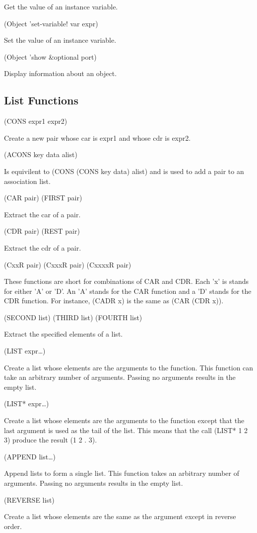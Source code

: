 \documentclass[11pt]{article}
\begin{document}
Get the value of an instance variable.

(Object 'set-variable! var expr)

Set the value of an instance variable.

(Object 'show  \&optional port)

Display information about an object.
\subsection{List Functions}
\label{sec-1-15}

(CONS expr1 expr2)

Create a new pair whose car is expr1 and whose cdr is expr2.

(ACONS key data alist)

Is equivilent to (CONS (CONS key data) alist) and is used to add a pair
to an association list.

(CAR pair)
(FIRST pair)

Extract the car of a pair.

(CDR pair)
(REST pair)

Extract the cdr of a pair.

(CxxR pair)
(CxxxR pair)
(CxxxxR pair)

These functions are short for combinations of CAR and CDR. Each 'x' is stands for either 'A' or 'D'. An 'A' stands for the CAR function and a 'D' stands for the CDR function. For instance, (CADR x) is the same as (CAR (CDR x)).

(SECOND list)
(THIRD list)
(FOURTH list)

Extract the specified elements of a list.

(LIST expr\ldots{})

Create a list whose elements are the arguments to the function. This
function can take an arbitrary number of arguments. Passing no arguments
results in the empty list.

(LIST* expr\ldots{})

Create a list whose elements are the arguments to the function except
that the last argument is used as the tail of the list. This means that
the call (LIST* 1 2 3) produce the result (1 2 . 3).

(APPEND list\ldots{})

Append lists to form a single list. This function takes an arbitrary
number of arguments. Passing no arguments results in the empty list.

(REVERSE list)

Create a list whose elements are the same as the argument except in
reverse order.
\end{document}
